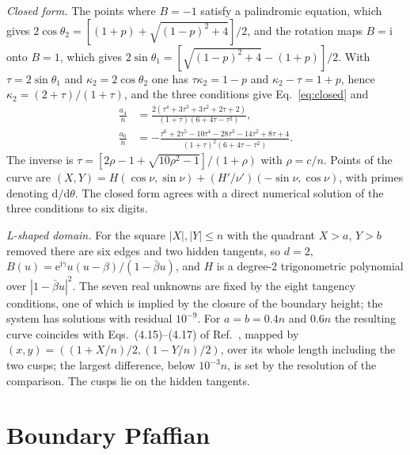 \documentclass[reprint,aps,prb,floatfix,longbibliography,amsmath,amssymb]{revtex4-2}
\newcommand{\dd}{\mathrm{d}}
\newcommand{\ii}{\mathrm{i}}
\newcommand{\ee}{\mathrm{e}}
\begin{document}
\emph{Closed form.} The points where $B=-1$ satisfy a palindromic equation, which gives $2\cos\theta_2=[(1+p)+\sqrt{(1-p)^2+4}]/2$, and the rotation maps $B=\ii$ onto $B=1$, which gives $2\sin\theta_1=[\sqrt{(1-p)^2+4}-(1+p)]/2$. With $\tau=2\sin\theta_1$ and $\kappa_2=2\cos\theta_2$ one has $\tau\kappa_2=1-p$ and $\kappa_2-\tau=1+p$, hence $\kappa_2=(2+\tau)/(1+\tau)$, and the three conditions give Eq.~\eqref{eq:closed} and
\begin{align}
  \frac{a_4}{n}&=\frac{2(\tau^4+3\tau^3+3\tau^2+2\tau+2)}{(1+\tau)(6+4\tau-\tau^2)},\\
  \frac{a_0}{n}&=-\frac{\tau^6+2\tau^5-10\tau^4-28\tau^3-14\tau^2+8\tau+4}{(1+\tau)^2(6+4\tau-\tau^2)}.
\end{align}
The inverse is $\tau=[2\rho-1+\sqrt{10\rho^2-1}]/(1+\rho)$ with $\rho=c/n$. Points of the curve are $(X,Y)=H(\cos\nu,\sin\nu)+(H'/\nu')(-\sin\nu,\cos\nu)$, with primes denoting $\dd/\dd\theta$. The closed form agrees with a direct numerical solution of the three conditions to six digits.

\emph{L-shaped domain.} For the square $|X|,|Y|\le n$ with the quadrant $X>a$, $Y>b$ removed there are six edges and two hidden tangents, so $d=2$, $B(u)=\ee^{\ii\gamma}u(u-\beta)/(1-\bar\beta u)$, and $H$ is a degree-2 trigonometric polynomial over $|1-\bar\beta u|^2$. The seven real unknowns are fixed by the eight tangency conditions, one of which is implied by the closure of the boundary height; the system has solutions with residual $10^{-9}$. For $a=b=0.4n$ and $0.6n$ the resulting curve coincides with Eqs.~(4.15)--(4.17) of Ref.~\cite{CPS2019}, mapped by $(x,y)=((1+X/n)/2,(1-Y/n)/2)$, over its whole length including the two cusps; the largest difference, below $10^{-3}n$, is set by the resolution of the comparison. The cusps lie on the hidden tangents.

\section{Boundary Pfaffian}\label{app:pfaffian}
\end{document}
